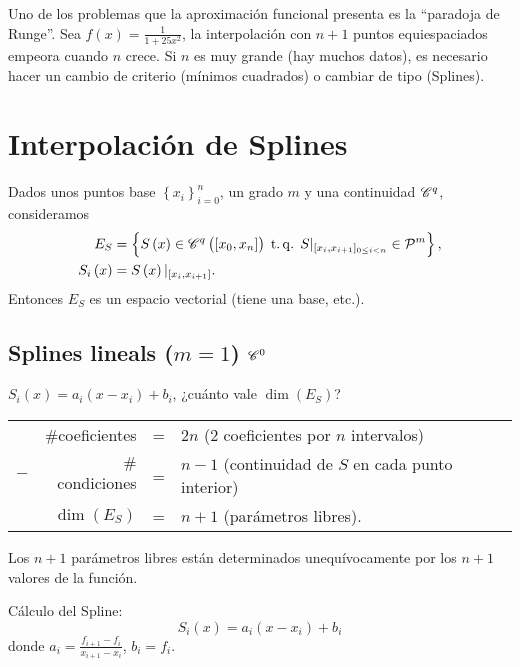 \begin{obs}
    Uno de los problemas que la aproximaci\'on funcional presenta es la ``paradoja de Runge''. Sea $f\left( x \right) = \frac{1}{1+25x^2}$, la interpolaci\'on con $n+1$ puntos equiespaciados empeora cuando $n$ crece. Si $n$ es muy grande (hay muchos datos), es necesario hacer un cambio de criterio (m\'inimos cuadrados) o cambiar de tipo (Splines).
\end{obs}

\section{Interpolaci\'on de Splines}

\begin{prop}
    Dados unos puntos base $\left\{ x_i \right\}_{i=0}^n$, un grado $m$ y una continuidad $\mathscr{C}^q$, consideramos
    \begin{align*}
        E_{S} &= \left\{S\left( x \right) \in \mathscr{C}^q\left( \left[ x_0, x_n \right] \right) \operatorname{\;t.q.\;} S\vert_{[ x_i, x_{i+1} ]_{0\leq i<n}} \in \mathcal{P}^m\right\}, \\
        S_i\left( x \right) &= S\left( x \right)\vert_{[ x_i, x_{i+1} ]}.
    \end{align*}
    Entonces $E_S$ es un espacio vectorial (tiene una base, etc.).
\end{prop}

\subsection{Splines lineals ($m=1$) $\mathscr{C}^0$}

$S_i\left( x \right) = a_i\left( x-x_i \right) + b_i$, ¿cuánto vale $\dim\left( E_S \right)$?
\begin{center}
    \begin{tabular}{crcl}
        & $\#$coeficientes &=& $2n$ (2 coeficientes por $n$ intervalos)\\
        $-$ & $\#$condiciones &=& $n-1$ (continuidad de $S$ en cada punto interior)\\\hline
        &$\dim\left( E_S \right)$ &=& $n+1$ (parámetros libres).
    \end{tabular}
\end{center}

Los $n+1$ parámetros libres están determinados unequívocamente por los $n+1$ valores de la función.

Cálculo del Spline: 
\[
    S_i\left( x \right) = a_i\left( x-x_i \right) + b_i
\]
donde $a_i = \frac{f_{i+1}-f_i}{x_{i+1}-x_i}$, $b_i = f_i$.


